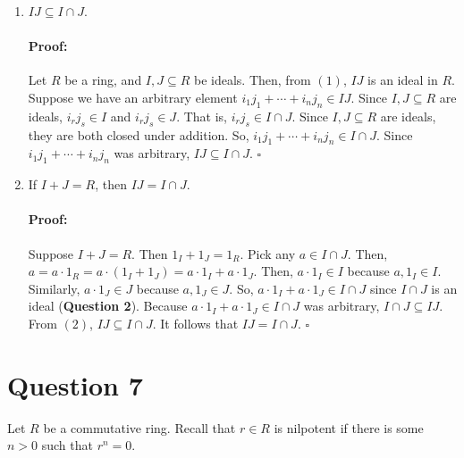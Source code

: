 \documentclass [12pt] {article}
\newenvironment{proof}{\paragraph{Proof:}}{\hfill$\square$}
\begin{document}
\begin{enumerate}
\begin{proof}
\begin{enumerate}
                    $at = t (i_1 j_1 + \cdots + i_n j_n) = t i_1 j_1 + \cdots + t i_n j_n$. Since 
                    $I, J \subseteq R$ are ideals, $i_r t, t i_r \in I, j_s \in J$, so
                    $t i_r j_s \in IJ$. Similarly, $i_r \in I, j_s t, t j_s \in J$, so
                    $i_r j_s t \in IJ$. So $IJ$ satisfies the absorbing property.
            \end{enumerate}
            Because $IJ$ satisfies (a) - (d), $IJ$ is an ideal. 
        \end{proof}
    \item $IJ \subseteq I \cap J$. 
        \vspace{-1em}
        \begin{proof}
            Let $R$ be a ring, and $I, J \subseteq R$ be ideals. Then, from $(1)$, $IJ$ is an ideal
            in $R$. Suppose we have an arbitrary element $i_1 j_1 + \cdots + i_n j_n \in IJ$. Since 
            $I, J \subseteq R$ are ideals, $i_r j_s \in I$ and $i_r j_s \in J$. That is, 
            $i_r j_s \in I \cap J$. Since $I, J \subseteq R$ are ideals, they are both closed under
            addition. So, $i_1 j_1 + \cdots + i_n j_n \in I \cap J$. Since 
            $i_1 j_1 + \cdots + i_n j_n$ was arbitrary, $IJ \subseteq I \cap J$.
        \end{proof}
    \item If $I+J=R$, then $IJ=I\cap J$.
        \vspace{-1em}
        \begin{proof}
            Suppose $I + J = R$. Then $1_I + 1_J = 1_R$. Pick any $a \in I \cap J$. Then,
            $a = a \cdot 1_R = a \cdot (1_I + 1_J) = a \cdot 1_I + a \cdot 1_J$. Then, 
            $a \cdot 1_I \in I$ because $a, 1_I \in I$. Similarly, $a \cdot 1_J \in J$ 
            because $a, 1_J \in J$. So, $a \cdot 1_I + a \cdot 1_J \in I \cap J$ since $I \cap J$ 
            is an ideal (\textbf{Question 2}). Because $a \cdot 1_I + a \cdot 1_J \in I \cap J$ 
            was arbitrary, $I \cap J \subseteq IJ$. From $(2)$, $IJ \subseteq I \cap J$. It follows 
            that $IJ = I \cap J$.
        \end{proof}
\end{enumerate}
\newpage

\section*{Question 7}
Let $R$ be a commutative ring. Recall that $r\in R$ is nilpotent if there is some $n>0$ such that $r^n=0$. 
\end{document}

